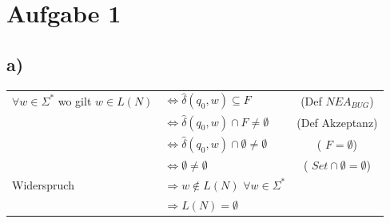 \section*{Aufgabe 1}

\subsection*{a)}
\begin{tabular}{l  l  c}
$\forall w \in \Sigma^{*}$ wo gilt $ w \in L(N) $ & $\Leftrightarrow \widehat{\delta} (q_0 , w) \subseteq F$ & (Def $NEA_{BUG}$) \\
& $\Leftrightarrow \widehat{\delta} (q_0 , w) \cap F \neq \emptyset$ & (Def Akzeptanz) \\
& $\Leftrightarrow \widehat{\delta} (q_0 , w) \cap \emptyset \neq \emptyset$ & ( $F= \emptyset $) \\
& $\Leftrightarrow \emptyset \neq \emptyset$ & ( $Set \cap \emptyset = \emptyset $) \\
 Widerspruch  & $\Rightarrow w \not \in L(N)$ $ \forall w \in \Sigma^{*} $ \\
 & $\Rightarrow  L(N) = \emptyset$ &
\end{tabular}
